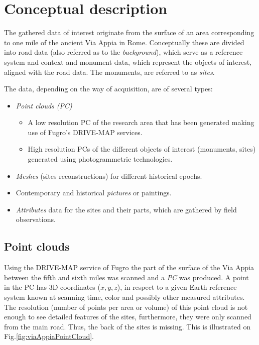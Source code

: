 \section{Conceptual description}
\label{sec:concept_descr}

The gathered data of interest originate from the surface of an area corresponding to one mile of the ancient Via Appia in Rome. Conceptually these are divided into road data (also referred as to the {\em background}), which serve as a reference system and context and monument data, which represent the objects of interest, aligned with the road data. The monuments, are referred to as {\em sites}. 

The data, depending on the way of acquisition, are of several types:
\begin{itemize}
\item {\em Point clouds (PC)}
\begin{itemize}
\item A low resolution PC of the research area that has been generated making use of Fugro's DRIVE-MAP services. 
\item High resolution PCs of the different objects of interest (monuments, sites) generated using photogrammetric technologies. 
\end{itemize}
\item {\em Meshes} (sites reconstructions) for different historical epochs. 
\item Contemporary and historical {\em pictures} or paintings. 
\item {\em Attributes} data for the sites and their parts, which are gathered by field observations. 
\end{itemize}

\subsection{Point clouds}
Using the DRIVE-MAP service of Fugro the part of the surface of the Via Appia between the fifth and sixth miles was scanned and a {\em PC} was produced. A point in the PC has 3D coordinates ($x, y, z$), in respect to a given Earth reference system known at scanning time, color and possibly other measured attributes. The resolution (number of points per area or volume) of this point cloud is not enough to see detailed features of the sites, furthermore, they were only scanned from the main road. Thus, the back of the sites is missing. This is illustrated on Fig.\ref{fig:viaAppiaPointCloud}.

